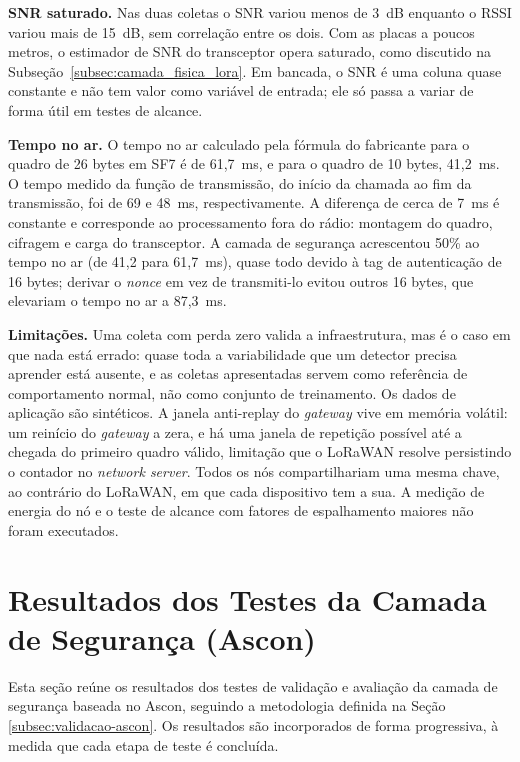 \textbf{SNR saturado.} Nas duas coletas o SNR variou menos de 3~dB enquanto o RSSI variou mais de 15~dB, sem correlação entre os dois. Com as placas a poucos metros, o estimador de SNR do transceptor opera saturado, como discutido na Subseção~\ref{subsec:camada_fisica_lora}. Em bancada, o SNR é uma coluna quase constante e não tem valor como variável de entrada; ele só passa a variar de forma útil em testes de alcance.

\textbf{Tempo no ar.} O tempo no ar calculado pela fórmula do fabricante para o quadro de 26 bytes em SF7 é de 61,7~ms, e para o quadro de 10 bytes, 41,2~ms. O tempo medido da função de transmissão, do início da chamada ao fim da transmissão, foi de 69 e 48~ms, respectivamente. A diferença de cerca de 7~ms é constante e corresponde ao processamento fora do rádio: montagem do quadro, cifragem e carga do transceptor. A camada de segurança acrescentou 50\% ao tempo no ar (de 41,2 para 61,7~ms), quase todo devido à tag de autenticação de 16 bytes; derivar o \textit{nonce} em vez de transmiti-lo evitou outros 16 bytes, que elevariam o tempo no ar a 87,3~ms.

\textbf{Limitações.} Uma coleta com perda zero valida a infraestrutura, mas é o caso em que nada está errado: quase toda a variabilidade que um detector precisa aprender está ausente, e as coletas apresentadas servem como referência de comportamento normal, não como conjunto de treinamento. Os dados de aplicação são sintéticos. A janela anti-replay do \textit{gateway} vive em memória volátil: um reinício do \textit{gateway} a zera, e há uma janela de repetição possível até a chegada do primeiro quadro válido, limitação que o LoRaWAN resolve persistindo o contador no \textit{network server}. Todos os nós compartilhariam uma mesma chave, ao contrário do LoRaWAN, em que cada dispositivo tem a sua. A medição de energia do nó e o teste de alcance com fatores de espalhamento maiores não foram executados.



\section{Resultados dos Testes da Camada de Segurança (Ascon)}
\label{sec:resultados_ascon}

Esta seção reúne os resultados dos testes de validação e avaliação da camada de segurança baseada no Ascon, seguindo a metodologia definida na Seção \ref{subsec:validacao-ascon}. Os resultados são incorporados de forma progressiva, à medida que cada etapa de teste é concluída.

